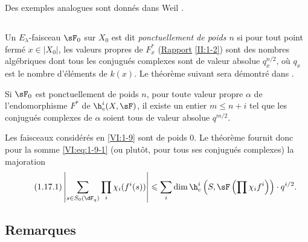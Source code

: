 Des exemples analogues sont donnés dans Weil \cite[App V, $3^\text{e}$ éd.]{we74}. 





\subsection{}\label{VI:1-16}

Un $E_\lambda$-faisceau $\sF_0$ sur $X_0$ est dit \emph{ponctuellement de 
poids $n$} si pour tout point fermé $x\in |X_0|$, les valeurs propres de 
$F_x^\ast$ (\hyperref[II]{Rapport} \ref{II:1-2}) sont des nombres algébriques 
dont tous les conjugués complexes sont de valeur absolue 
$q_x^{n/2}$, où $q_x$ est le nombre d'éléments de $k(x)$. Le théorème 
suivant sera démontré dans . 





\begin{theorem_}\label{VI:1-17}
Si $\sF_0$ est ponctuellement de poids $n$, pour toute valeur propre $\alpha$ 
de l'endomorphisme $F^\ast$ de $\h_c^i(X,\sF)$, il existe un entier 
$m\leqslant n+i$ tel que les conjugués complexes de $\alpha$ soient tous de 
valeur absolue $q^{m/2}$.
\end{theorem_}

Les faisceaux considérés en \ref{VI:1-9} sont de poids $0$. Le théorème 
fournit donc pour la somme \ref{VI:eq:1-9-1} (ou plutôt, pour tous ses 
conjugués complexes) la majoration 
\begin{equation*}\tag{1.17.1}\label{VI:eq:1-17-1}
  \left|\sum_{s\in S_0(\dF_q)} \prod_i \chi_i(f^i(s)) \right| \leqslant \sum_i \dim \h_c^i\left(S,\sF\left(\prod \chi_i f^i\right)\right)\cdot q^{i/2} \text{.}
\end{equation*}





\subsection{Remarques}\label{VI:1-18}

